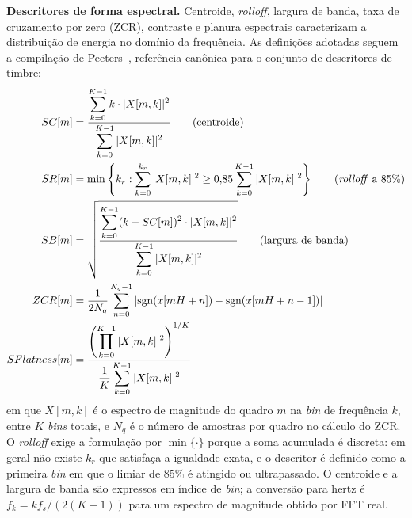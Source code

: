 \documentclass[12pt,a4paper]{article}
\begin{document}
\textbf{Descritores de forma espectral.} Centroide, \textit{rolloff},
largura de banda, taxa de cruzamento por zero (ZCR), contraste e planura
espectrais caracterizam a distribuição de energia no domínio da frequência.
As definições adotadas seguem a compilação de Peeters~\cite{peeters2004large},
referência canônica para o conjunto de descritores de timbre:
\begin{align}
	SC[m] &= \frac{\displaystyle\sum_{k=0}^{K-1} k\cdot|X[m,k]|^2}
	{\displaystyle\sum_{k=0}^{K-1}|X[m,k]|^2}
	\qquad \text{(centroide)} \\
	SR[m] &= \min\left\{ k_r :
	\sum_{k=0}^{k_r}|X[m,k]|^2 \geq 0{,}85\sum_{k=0}^{K-1}|X[m,k]|^2 \right\}
	\qquad \text{(\textit{rolloff} a \num{85}\%)} \\
	SB[m] &=
	\sqrt{\frac{\displaystyle\sum_{k=0}^{K-1}(k-SC[m])^2\cdot|X[m,k]|^2}
		{\displaystyle\sum_{k=0}^{K-1}|X[m,k]|^2}}
	\qquad \text{(largura de banda)} \\
	ZCR[m] &= \frac{1}{2N_q}\sum_{n=0}^{N_q-1}
	\left|\mathrm{sgn}(x[mH+n]) - \mathrm{sgn}(x[mH+n-1])\right| \\
	SFlatness[m] &=
	\frac{\left(\displaystyle\prod_{k=0}^{K-1}|X[m,k]|^2\right)^{1/K}}
	{\dfrac{1}{K}\displaystyle\sum_{k=0}^{K-1}|X[m,k]|^2}
\end{align}
\noindent
em que $X[m,k]$ é o espectro de magnitude do quadro $m$ na \textit{bin} de
frequência $k$, entre $K$ \textit{bins} totais, e $N_q$ é o número de amostras
por quadro no cálculo do ZCR. O \textit{rolloff} exige a formulação por
$\min\{\cdot\}$ porque a soma acumulada é discreta: em geral não existe $k_r$
que satisfaça a igualdade exata, e o descritor é definido como a primeira
\textit{bin} em que o limiar de \num{85}\% é atingido ou ultrapassado. O
centroide e a largura de banda são expressos em índice de \textit{bin}; a
conversão para hertz é $f_k = k f_s / (2(K-1))$ para um espectro de
magnitude obtido por FFT real.
\end{document}
